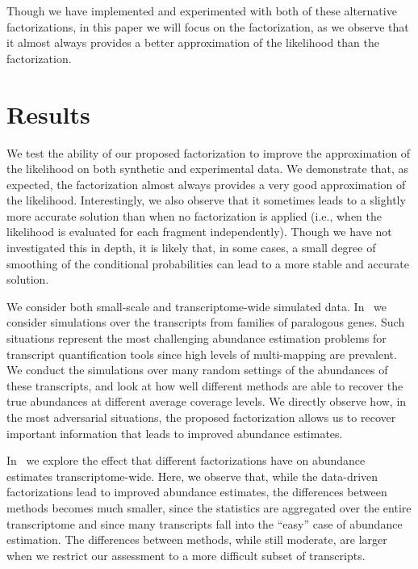 Though we have implemented and experimented with both of these alternative factorizations, 
in this paper we will focus on the \rangebased factorization, as we observe that it almost 
always provides a better approximation of the likelihood than the \rankbased factorization.

\section{Results}
\label{sec:results}

We test the ability of our proposed factorization to improve the approximation
of the \fm likelihood on both synthetic and experimental data. We demonstrate
that, as expected, the \rangebased factorization almost always provides a very
good approximation of the \fm likelihood. Interestingly, we also observe that it
sometimes leads to a slightly more accurate solution than when no factorization
is applied (i.e., when the likelihood is evaluated for each fragment
independently). Though we have not investigated this in depth, it is likely
that, in some cases, a small degree of smoothing of the conditional
probabilities can lead to a more stable and accurate solution.

We consider both small-scale and transcriptome-wide simulated data.
In~ we consider simulations over the transcripts from
families of paralogous genes. Such situations represent the most challenging
abundance estimation problems for transcript quantification tools since high
levels of multi-mapping are prevalent. We conduct the simulations over many
random settings of the abundances of these transcripts, and look at how well
different methods are able to recover the true abundances at different average
coverage levels. We directly observe how, in the most adversarial situations,
the proposed factorization allows us to recover important information that leads
to improved abundance estimates.

In~ we explore the effect that different factorizations
have on abundance estimates transcriptome-wide. Here, we observe that, while the
data-driven factorizations lead to improved abundance estimates, the differences
between methods becomes much smaller, since the statistics are aggregated over
the entire transcriptome and since many transcripts fall into the ``easy'' case
of abundance estimation. The differences between methods, while still moderate,
are larger when we restrict our assessment to a more difficult subset of transcripts.

